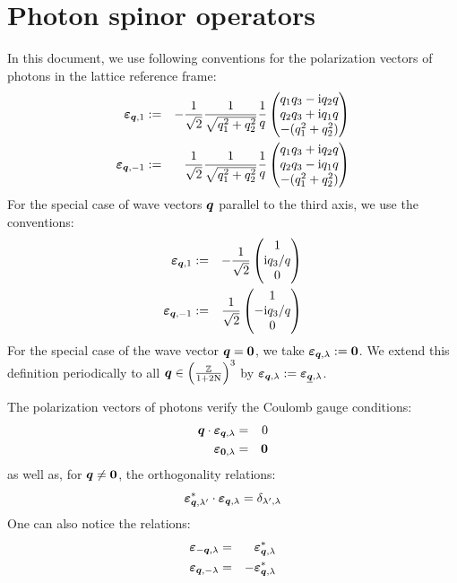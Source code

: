 \documentclass[10pt,a4paper,twoside,openany]{book}
\begin{document}
\section{Photon spinor operators}
\label{Photon spinors}

In this document, we use following conventions for the polarization vectors of photons in the lattice reference frame:
\begin{eqnarray*}
\boldsymbol{\varepsilon}_{{\boldsymbol{q}},{1}} & := & - \frac 1 {\sqrt 2} \frac 1 {\sqrt{{q}_{1}^2 + {q}_{2}^2}} \frac 1 q \begin{pmatrix}  {q}_{1} {q}_{3} - \mathrm{i} {q}_{2} q \\ {q}_{2} {q}_{3} + \mathrm{i} {q}_{1} q \\ -( {q}_{1}^2 + {q}_{2}^2 )  \end{pmatrix} \\
\boldsymbol{\varepsilon}_{{\boldsymbol{q}},{-1}} & := & \frac 1 {\sqrt 2} \frac 1 {\sqrt{{q}_{1}^2 + {q}_{2}^2}} \frac 1 q \begin{pmatrix}  {q}_{1} {q}_{3} + \mathrm{i} {q}_{2} q \\ {q}_{2} {q}_{3} - \mathrm{i} {q}_{1} q \\ -( {q}_{1}^2 + {q}_{2}^2 )  \end{pmatrix}
\end{eqnarray*}
For the special case of wave vectors $\boldsymbol{q}$ parallel to the third axis, we use the conventions:
\begin{eqnarray*}
\boldsymbol{\varepsilon}_{{\boldsymbol{q}},{1}} & := & - \frac 1 {\sqrt 2} \begin{pmatrix}  1 \\ \mathrm{i} {q}_{3} / q \\ 0  \end{pmatrix} \\
\boldsymbol{\varepsilon}_{{\boldsymbol{q}},{-1}} & := & \frac 1 {\sqrt 2} \begin{pmatrix}  1 \\ - \mathrm{i} {q}_{3} / q \\ 0  \end{pmatrix}
\end{eqnarray*}
For the special case of the wave vector $\boldsymbol{q} = \boldsymbol{0}$, we take $\boldsymbol{\varepsilon}_{{\boldsymbol{q}},{\lambda}} := \boldsymbol{0}$. We extend this definition periodically to all $\boldsymbol{q} \in \left( \frac{\mathbb{Z}}{1 + 2 \mathrm N} \right)^3$ by $\boldsymbol{\varepsilon}_{{\boldsymbol{q}},{\lambda}} := \boldsymbol{\varepsilon}_{{\underline{\boldsymbol{q}}},{\lambda}}$.

The polarization vectors of photons verify the Coulomb gauge conditions:
\begin{eqnarray*}
\boldsymbol{q} \cdot \boldsymbol{\varepsilon}_{{\boldsymbol{q}},{\lambda}} & = & 0 \\
\boldsymbol{\varepsilon}_{{\boldsymbol{0}},{\lambda}} & = & \boldsymbol{0}
\end{eqnarray*}
as well as, for $\boldsymbol{q} \neq \boldsymbol{0}$, the orthogonality relations:
\begin{equation*}
\boldsymbol{\varepsilon}_{{\boldsymbol{q}},{\lambda'}}^* \cdot \boldsymbol{\varepsilon}_{{\boldsymbol{q}},{\lambda}} = \delta_{\lambda',\lambda}
\end{equation*}
One can also notice the relations:
\begin{eqnarray*}
\boldsymbol{\varepsilon}_{{- \boldsymbol{q}},{\lambda}} & = & \boldsymbol{\varepsilon}_{{\boldsymbol{q}},{\lambda}}^* \\
\boldsymbol{\varepsilon}_{{\boldsymbol{q}},{- \lambda}} & = & - \boldsymbol{\varepsilon}_{{\boldsymbol{q}},{\lambda}}^*
\end{eqnarray*}
\end{document}
